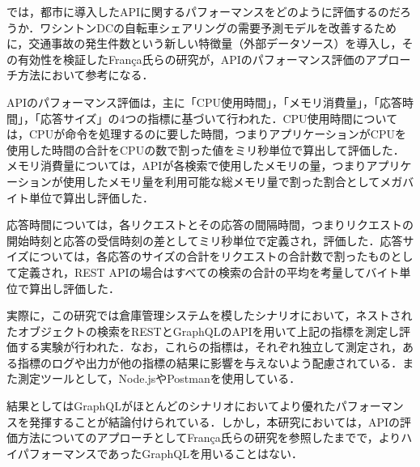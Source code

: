       \par では，都市に導入したAPIに関するパフォーマンスをどのように評価するのだろうか．ワシントンDCの自転車シェアリングの需要予測モデルを改善するために，交通事故の発生件数という新しい特徴量（外部データソース）を導入し，その有効性を検証したFrança氏らの研究が，APIのパフォーマンス評価のアプローチ方法において参考になる．
      \par APIのパフォーマンス評価は，主に「CPU使用時間」，「メモリ消費量」，「応答時間」，「応答サイズ」の4つの指標に基づいて行われた．CPU使用時間については，CPUが命令を処理するのに要した時間，つまりアプリケーションがCPUを使用した時間の合計をCPUの数で割った値をミリ秒単位で算出して評価した．メモリ消費量については，APIが各検索で使用したメモリの量，つまりアプリケーションが使用したメモリ量を利用可能な総メモリ量で割った割合としてメガバイト単位で算出し評価した．
      \par 応答時間については，各リクエストとその応答の間隔時間，つまりリクエストの開始時刻と応答の受信時刻の差としてミリ秒単位で定義され，評価した．応答サイズについては，各応答のサイズの合計をリクエストの合計数で割ったものとして定義され，REST APIの場合はすべての検索の合計の平均を考量してバイト単位で算出し評価した．
      \par 実際に，この研究では倉庫管理システムを模したシナリオにおいて，ネストされたオブジェクトの検索をRESTとGraphQLのAPIを用いて上記の指標を測定し評価する実験が行われた．なお，これらの指標は，それぞれ独立して測定され，ある指標のログや出力が他の指標の結果に影響を与えないよう配慮されている．また測定ツールとして，Node.jsやPostmanを使用している．
      \par 結果としてはGraphQLがほとんどのシナリオにおいてより優れたパフォーマンスを発揮することが結論付けられている．しかし，本研究においては，APIの評価方法についてのアプローチとしてFrança氏らの研究を参照したまでで，よりハイパフォーマンスであったGraphQLを用いることはない．
